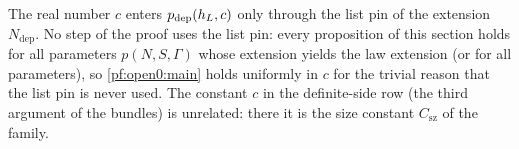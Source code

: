 \begin{remark}\label{pf:open0:rem:c}
The real number $c$ enters $p_{\mathrm{dep}}(h_L,c)$ only through the list pin of the extension $N_{\mathrm{dep}}$. No step of the proof
uses the list pin: every proposition of this section holds for all parameters $p(N,S,\Gamma)$ whose extension yields the law
extension (or for all parameters), so \cref{pf:open0:main} holds uniformly in $c$ for the trivial reason that the list pin is never
used. The constant $c$ in the definite-side row (the third argument of the bundles) is unrelated: there it is the size constant
$C_{\mathrm{sz}}$ of the family.
\end{remark}


